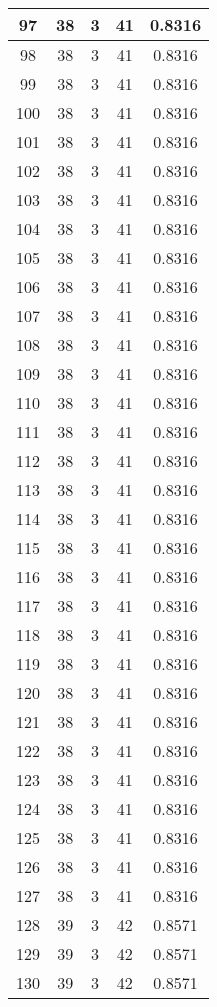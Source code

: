 \documentclass[letterpaper, 12pt]{article}
\begin{document}
\begin{longtable}{|c|c|c|c|c|}
\hline
97 & 38 & 3 & 41 & 0.8316 \\
\hline
98 & 38 & 3 & 41 & 0.8316 \\
\hline
99 & 38 & 3 & 41 & 0.8316 \\
\hline
100 & 38 & 3 & 41 & 0.8316 \\
\hline
101 & 38 & 3 & 41 & 0.8316 \\
\hline
102 & 38 & 3 & 41 & 0.8316 \\
\hline
103 & 38 & 3 & 41 & 0.8316 \\
\hline
104 & 38 & 3 & 41 & 0.8316 \\
\hline
105 & 38 & 3 & 41 & 0.8316 \\
\hline
106 & 38 & 3 & 41 & 0.8316 \\
\hline
107 & 38 & 3 & 41 & 0.8316 \\
\hline
108 & 38 & 3 & 41 & 0.8316 \\
\hline
109 & 38 & 3 & 41 & 0.8316 \\
\hline
110 & 38 & 3 & 41 & 0.8316 \\
\hline
111 & 38 & 3 & 41 & 0.8316 \\
\hline
112 & 38 & 3 & 41 & 0.8316 \\
\hline
113 & 38 & 3 & 41 & 0.8316 \\
\hline
114 & 38 & 3 & 41 & 0.8316 \\
\hline
115 & 38 & 3 & 41 & 0.8316 \\
\hline
116 & 38 & 3 & 41 & 0.8316 \\
\hline
117 & 38 & 3 & 41 & 0.8316 \\
\hline
118 & 38 & 3 & 41 & 0.8316 \\
\hline
119 & 38 & 3 & 41 & 0.8316 \\
\hline
120 & 38 & 3 & 41 & 0.8316 \\
\hline
121 & 38 & 3 & 41 & 0.8316 \\
\hline
122 & 38 & 3 & 41 & 0.8316 \\
\hline
123 & 38 & 3 & 41 & 0.8316 \\
\hline
124 & 38 & 3 & 41 & 0.8316 \\
\hline
125 & 38 & 3 & 41 & 0.8316 \\
\hline
126 & 38 & 3 & 41 & 0.8316 \\
\hline
127 & 38 & 3 & 41 & 0.8316 \\
\hline
128 & 39 & 3 & 42 & 0.8571 \\
\hline
129 & 39 & 3 & 42 & 0.8571 \\
\hline
130 & 39 & 3 & 42 & 0.8571 \\

\end{longtable}
\end{document}
